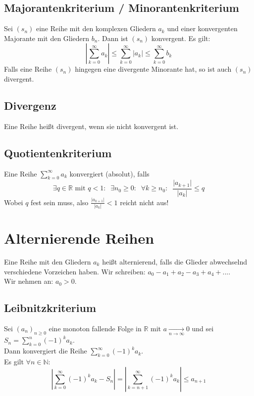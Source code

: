 \documentclass[halfparscip]{scrartcl}
\newcounter{subsection2}
\begin{document}
\subsection{Majorantenkriterium / Minorantenkriterium}
Sei $(s_n)$ eine Reihe mit den komplexen Gliedern $a_k$ und einer konvergenten Majorante mit den Gliedern $b_n$. Dann ist $(s_n)$ konvergent.
Es gilt:
\begin{equation*}
	\left\vert\sum_{k=0}^{\infty}a_k\right\vert \leq \sum_{k=0}^\infty \vert a_k\vert \leq \sum_{k=0}^\infty b_k
\end{equation*}
Falls eine Reihe $(s_n)$ hingegen eine divergente Minorante hat, so ist auch $(s_n)$ divergent.


\subsection{Divergenz}
Eine Reihe heißt divergent, wenn sie nicht konvergent ist.

\subsection{Quotientenkriterium}
Eine Reihe $\sum_{k=0}^\infty a_k$ konvergiert (absolut), falls
\begin{equation*}
	\exists q \in \mathbb{R} \text{ mit } q < 1: \;\; \exists n_0 \geq 0: \;\; \forall k \geq n_0: \;\; \frac{\vert a_{k+1}\vert}{\vert a_k\vert} \leq q
\end{equation*}
Wobei $q$ fest sein muss, also $\frac{\vert a_{k+1}\vert}{\vert a_k\vert} < 1$ reicht nicht aus!

\setcounter{subsection2}{\value{subsection}}
\section*{Alternierende Reihen}
\setcounter{subsection}{\value{subsection2}}
Eine Reihe mit den Gliedern $a_k$ heißt alternierend, falls die Glieder abwechselnd verschiedene Vorzeichen haben. Wir schreiben: $a_0 - a_1 + a_2 - a_3 + a_4 + ...$.\\
Wir nehmen an: $a_0 > 0$.

\subsection{Leibnitzkriterium}
Sei $(a_n)_{n\geq0}$ eine monoton fallende Folge in $\mathbb{R}$ mit $a \xrightarrow[n \rightarrow \infty]{} 0$ und sei $S_n = \sum\limits_{k=0}^n(-1)^ka_k$.\\
Dann konvergiert die Reihe $\sum\limits_{k=0}^\infty(-1)^ka_k$.\\
Es gilt $\forall n \in \mathbb{N}$:
\begin{equation*}
	\left\vert \sum_{k=0}^{\infty}(-1)^ka_k-S_n\right\vert = \left\vert \sum_{k=n+1}^{\infty}(-1)^ka_k\right\vert \leq a_{n+1}
\end{equation*}
\end{document}
